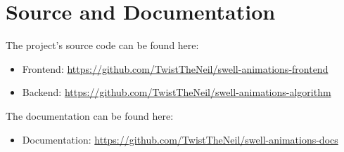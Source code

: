 \section{Source and Documentation} \label{App:AppendixSD}
The project's source code can be found here:
\begin{itemize}
    \item Frontend: \url{https://github.com/TwistTheNeil/swell-animations-frontend}
    \item Backend: \url{https://github.com/TwistTheNeil/swell-animations-algorithm}
\end{itemize}
The documentation can be found here:
\begin{itemize}
    \item Documentation: \url{https://github.com/TwistTheNeil/swell-animations-docs}
\end{itemize}
